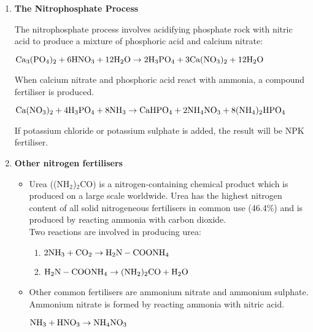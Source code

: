 \begin{enumerate}
\begin{enumerate}
	\item{\textbf{The Nitrophosphate Process}}

The nitrophosphate process involves acidifying phosphate rock with nitric acid to produce a mixture of phosphoric acid and calcium nitrate:
\begin{center}
$\rm{Ca_{3}(PO_{4})_{2} + 6HNO_{3} + 12H_{2}O \rightarrow 2H_{3}PO_{4} + 3Ca(NO_{3})_{2} + 12H_{2}O}$\\
\end{center}

When calcium nitrate and phosphoric acid react with ammonia, a compound fertiliser is produced.
\begin{center}
$\rm{Ca(NO_{3})_{2} + 4H_{3}PO_{4} + 8NH_{3} \rightarrow CaHPO_{4} + 2NH_{4}NO_{3} + 8(NH_{4})_2HPO_{4}}$ 
\end{center}

If potassium chloride or potassium sulphate is added, the result will be NPK fertiliser. 

	\item{\textbf{Other nitrogen fertilisers}}
\begin{itemize}
\item{
Urea ((NH$_{2}$)$_{2}$CO) is a nitrogen-containing chemical product which is produced on a large scale worldwide. Urea has the highest nitrogen content of all solid nitrogeneous fertilisers in common use (46.4\%) and is produced by reacting ammonia with carbon dioxide.\\

Two reactions are involved in producing urea:\\

\begin{enumerate}

\item{
$\rm{2NH_{3} + CO_{2} \rightarrow H_{2}N-COONH_{4}}$
}

\item{
$\rm{H_{2}N-COONH_{4} \rightarrow (NH_{2})_{2}CO + H_{2}O}$\\
}

\end{enumerate}
}

\item{Other common fertilisers are ammonium nitrate and ammonium sulphate. Ammonium nitrate is formed by reacting ammonia with nitric acid. 

\begin{center}
$\rm{NH_{3} + HNO_{3} \rightarrow NH_{4}NO_{3}}$
\end{center}

}
\end{itemize}
\end{enumerate}
\end{enumerate}
